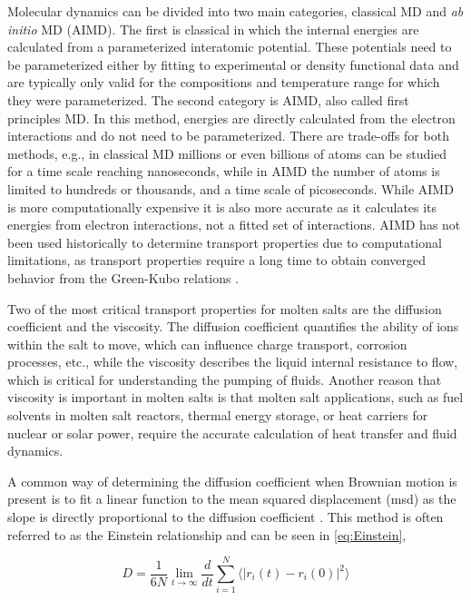 \documentclass[review]{elsarticle}
\begin{document}
Molecular dynamics  can be divided into two main categories, classical MD and \textit{ab initio} MD (AIMD). The first is classical in which the internal energies are calculated from a parameterized interatomic potential. These potentials need to be parameterized either by fitting to experimental or density functional data and are typically only valid for the compositions and temperature range for which they were parameterized. The second category is AIMD, also called first principles MD. In this method, energies are directly calculated from the electron interactions and do not need to be parameterized. There are trade-offs for both methods, e.g., in classical MD millions or even billions of atoms can be studied for a time scale reaching nanoseconds, while in AIMD the number of atoms is limited to hundreds or thousands, and a time scale of picoseconds. While AIMD is more computationally expensive it is also more accurate as it calculates its energies from electron interactions, not a fitted set of interactions. AIMD has not been used historically to determine transport properties due to computational limitations, as transport properties require a long time to obtain converged behavior from the Green-Kubo relations \cite{PhysRevA.7.1439}.


Two of the most critical transport properties for molten salts are the diffusion coefficient and the viscosity. The diffusion coefficient quantifies the ability of ions within the salt to move, which can influence charge transport, corrosion processes, etc., while the viscosity describes the liquid internal resistance to flow, which is critical for understanding the pumping of fluids. Another reason that viscosity is important in molten salts is that molten salt applications, such as fuel solvents in molten salt reactors, thermal energy storage, or heat carriers for nuclear or solar power, require the accurate calculation of heat transfer and fluid dynamics.

A common way of determining the diffusion coefficient when Brownian motion is present is to fit a linear function to the mean squared displacement (msd) as the slope is directly proportional to the diffusion coefficient \cite{qian1991single}. This method is often referred to as the Einstein relationship and can be seen in \cref{eq:Einstein},

\begin{equation}
  \label{eq:Einstein}
     D = \frac{1}{6N} \lim_{t\to\infty}\frac{d}{dt}\sum_{i=1}^N \langle |r_i(t) - r_i(0)|^2\rangle
\end{equation}
\end{document}
